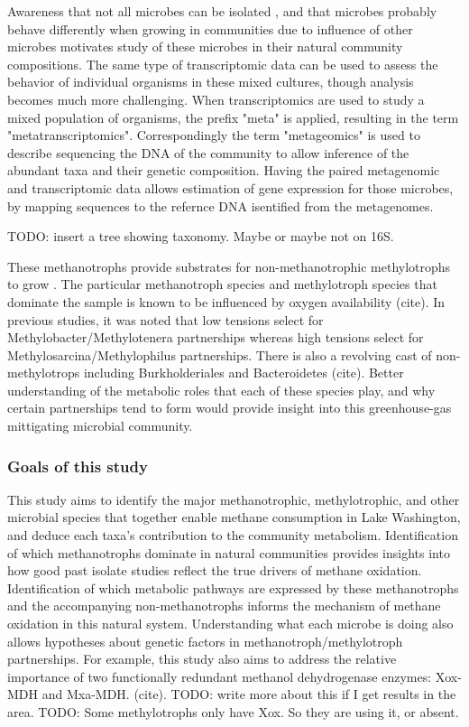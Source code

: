 Awareness that not all microbes can be isolated \cite{kaeberlein2002, stewart2012}, and that microbes probably behave differently when growing in communities due to influence of other microbes motivates study of these microbes in their natural community compositions.
The same type of transcriptomic data can be used to assess the behavior of individual organisms in these mixed cultures, though analysis becomes much more challenging.
When transcriptomics are used to study a mixed population of organisms, the prefix "meta" is applied, resulting in the term "metatranscriptomics".
Correspondingly the term "metageomics" is used to describe sequencing the DNA of the community to allow inference of the abundant taxa and their genetic composition.
Having the paired metagenomic and transcriptomic data allows estimation of gene expression for those microbes, by mapping sequences to the refernce DNA isentified from the metagenomes.


TODO: insert a tree showing taxonomy.  Maybe or maybe not on 16S.

These methanotrophs provide substrates for non-methanotrophic methylotrophs to grow \cite{beck2013LW}.
The particular methanotroph species and methylotroph species that dominate the sample is known to be influenced by oxygen availability (cite).
In previous studies, it was noted that low  tensions select for Methylobacter/Methylotenera partnerships whereas high  tensions select for Methylosarcina/Methylophilus partnerships.
There is also a revolving cast of non-methylotrops including Burkholderiales and Bacteroidetes (cite).
Better understanding of the metabolic roles that each of these species play, and why certain partnerships tend to form would provide insight into this greenhouse-gas mittigating microbial community.

\subsubsection{Goals of this study}
This study aims to identify the major methanotrophic, methylotrophic, and other microbial species that together enable methane consumption in Lake Washington, and deduce each taxa's contribution to the community metabolism.
Identification of which methanotrophs dominate in natural communities provides insights into how good past isolate studies reflect the true drivers of methane oxidation.
Identification of which metabolic pathways are expressed by these methanotrophs and the accompanying non-methanotrophs informs the mechanism of methane oxidation in this natural system.
Understanding what each microbe is doing also allows hypotheses about genetic factors in methanotroph/methylotroph partnerships.
For example, this study also aims to address the relative importance of two functionally redundant methanol dehydrogenase enzymes: Xox-MDH and Mxa-MDH. (cite).
TODO: write more about this if I get results in the area.
TODO: Some methylotrophs only have Xox.  So they are using it, or absent.

